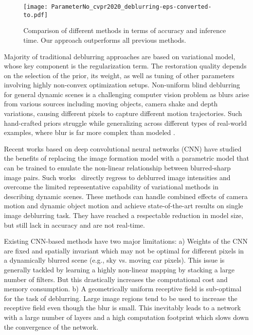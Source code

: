 \documentclass[10pt,twocolumn,letterpaper]{article}
\begin{document}
\begin{figure}[t] \label{fig:intro}
\begin{center}
   \texttt{[image: ParameterNo\_cvpr2020\_deblurring-eps-converted-to.pdf]}
\end{center}
   \caption{Comparison of different methods in terms of accuracy and inference time. Our approach outperforms all previous methods.}
\label{fig:long}
\label{fig:onecol}
\end{figure}

Majority of traditional deblurring approaches are based on variational model, whose key component is the regularization term. The restoration quality depends on the selection of the prior, its weight, as well as tuning of other parameters involving highly non-convex optimization setups\cite{nimisha2017blur}. Non-uniform blind deblurring for general dynamic scenes is a challenging computer vision problem as blurs arise from various sources including moving objects, camera shake and depth variations, causing different pixels to capture different motion trajectories. Such hand-crafted priors struggle while generalizing across different types of real-world examples, where blur is far more complex than modeled \cite{gong2017motion}. 







Recent works based on deep convolutional neural networks (CNN) have studied the benefits of replacing the image formation model with a parametric model that can be trained to emulate the non-linear relationship between blurred-sharp image pairs. Such works~\cite{nah2017deep} directly regress to deblurred image intensities and overcome the limited representative capability of variational methods in describing dynamic scenes. These methods can handle combined effects of camera motion and dynamic object motion and achieve state-of-the-art results on single image deblurring task. They have reached a respectable reduction in model size, but still lack in accuracy and are not real-time.


Existing CNN-based methods have two major limitations:
a) Weights of the CNN are fixed and spatially invariant which may not be optimal for different pixels in a dynamically blurred scene (e.g., sky vs. moving car pixels). This issue is generally tackled by learning a highly non-linear mapping by stacking a large number of filters. But this drastically increases the computational cost and memory consumption. b) A geometrically uniform receptive field is sub-optimal for the task of deblurring. Large image regions tend to be used to increase the receptive field even though the blur is small. This inevitably leads to a network with a large number of layers and a high computation footprint which slows down the convergence of the network.
\end{document}
